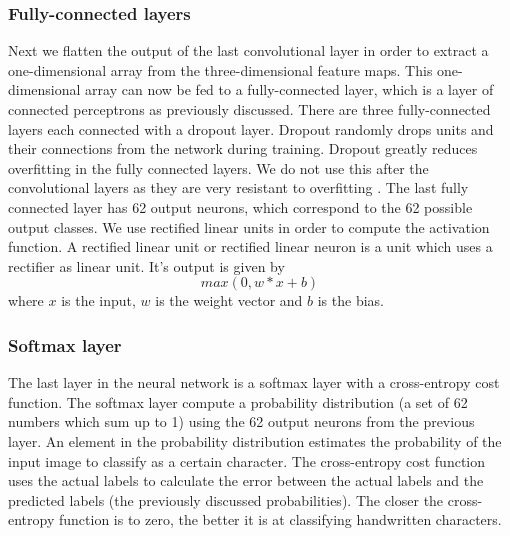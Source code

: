 \documentclass{article}
\begin{document}
\subsubsection{Fully-connected layers}
Next we flatten the output of the last convolutional layer in order to extract a one-dimensional array from the three-dimensional feature maps. This one-dimensional array can now be fed to a fully-connected layer, which is a layer of connected perceptrons as previously discussed. 
There are three fully-connected layers each connected with a dropout layer. Dropout randomly drops units and their connections from the network during training. Dropout greatly reduces overfitting in the fully connected layers. \cite{dropout} We do not use this after the convolutional layers as they are very resistant to overfitting \cite{nnbook}. 
The last fully connected layer has 62 output neurons, which correspond to the 62 possible output classes. We use rectified linear units in order to compute the activation function. A rectified linear unit or rectified linear neuron is a unit which uses a rectifier as linear unit. It's output is given by 
\begin{equation}
        max(0, w*x+b)
\end{equation}
where $x$ is the input, $w$ is the weight vector and $b$ is the bias. 
\subsubsection{Softmax layer}
 The last layer in the neural network is a softmax layer with a cross-entropy cost function. The softmax layer compute a probability distribution (a set of 62 numbers which sum up to 1) using the 62 output neurons from the previous layer. An element in the probability distribution estimates the probability of the input image to classify as a certain character. 
 The cross-entropy cost function uses the actual labels to calculate the error between the actual labels and the predicted labels (the previously discussed probabilities). The closer the cross-entropy function is to zero, the better it is at classifying handwritten characters.
\end{document}
